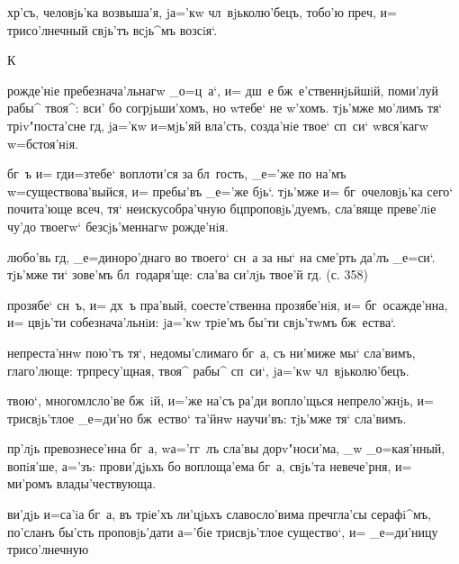 хр'съ, человjь'ка возвыша'я, jа='кw чл~вjьколю'бецъ, 
тобо'ю преч, и= трисо'лнечный свjь'тъ всjь^мъ 
возсiя`.


К%

рожде'нiе пребезнача'льнагw _о=ц~а`, и= дш~е 
бж~е'ственнjьйшiй, поми'луй рабы^ твоя^: вси' бо 
согрjьши'хомъ, но w\т тебе` не w'хомъ. тjь'мже 
мо'лимъ тя` трiv"поста'сне гд, jа='кw и=мjь'яй 
вла'сть, созда'нiе твое` сп~си` w\т вся'кагw w=бстоя'нiя.

бг~ъ и= гд и=з\ъ тебе` воплоти'ся за бл~гость, _е='же 
по на'мъ w=существова'выйся, и= пребы'въ _е='же бjь`. 
тjь'мже и= бг~очеловjь'ка сего` почита'юще всеч, тя` 
неискусобра'чную бц проповjь'дуемъ, сла'вяще преве'лiе 
чу'до твоегw` безсjь'меннагw рожде'нiя.


любо'вь гд, _е=диноро'днаго во твоего` сн~а за ны` на 
сме'рть да'лъ _е=си`. тjь'мже ти` зове'мъ бл~годаря'ще: 
сла'ва си'лjь твое'й гд. (с. 358)

прозябе` сн~ъ, и= дх~ъ пра'вый, соесте'ственна 
прозябе'нiя, и= бг~осажде'нна, и= цвjь'ти 
собезнача'льнiи: jа='кw трiе'мъ бы'ти свjь'тwмъ 
бж~ества`. %

непреста'ннw пою'тъ тя`, недомы'слимаго бг~а, съ ни'миже 
мы` сла'вимъ, глаго'люще: тр пресу'щная, твоя^ рабы^ 
сп~си`, jа='кw чл~вjьколю'бецъ.

твою`, многомл сло'ве бж~iй, и='же на'съ ра'ди 
вопло'щься непрело'жнjь, и= трисвjь'тлое _е=ди'но 
бж~ество` та'йнw научи'въ: тjь'мже тя` сла'вимъ.


пр'лjь превознесе'нна бг~а, w\т а='гг~лъ сла'вы 
дорv"носи'ма, _w _о=кая'нный, вопiя'ше, а='зъ: 
прови'дjьхъ бо воплоща'ема бг~а, свjь'та невече'рня, и= 
ми'ромъ влады'чествующа.

ви'дjь и=са'iа бг~а, въ трiе'хъ ли'цjьхъ славосло'вима 
преч гла'сы серафi^мъ, по'сланъ бы'сть 
проповjь'дати а='бiе трисвjь'тлое существо`, и= 
_е=ди'ницу трисо'лнечную %

